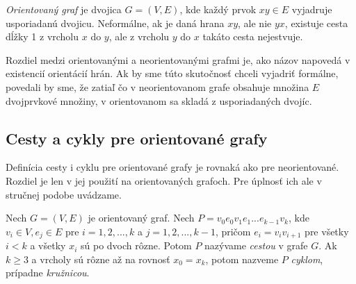 \textit{Orientovaný graf} je dvojica $G = (V, E)$, kde každý prvok $xy \in E$ vyjadruje usporiadanú dvojicu. Neformálne, ak je daná hrana $xy$, ale nie $yx$, existuje cesta dĺžky 1 z vrcholu $x$ do $y$, ale z vrcholu $y$ do $x$ takáto cesta nejestvuje.\newline

Rozdiel medzi orientovanými a neorientovanými grafmi je, ako názov napovedá v existencií orientácií hrán. Ak by sme túto skutočnosť chceli vyjadriť formálne, povedali by sme, že zatiaľ čo v neorientovanom grafe obsahuje množina $E$ dvojprvkové množiny, v orientovanom sa skladá z usporiadaných dvojíc.\newline


\subsection{Cesty a cykly pre orientované grafy}

Definícia cesty i cyklu pre orientované grafy je rovnaká ako pre neorientované. Rozdiel je len v jej použití na orientovaných grafoch. Pre úplnosť ich ale v stručnej podobe uvádzame.\newline

Nech $G = (V, E)$ je orientovaný graf. Nech $P = v_{0}e_{0}v_{1}e_{1} ... e_{k-1}v_{k}$, kde $ v_{i} \in V, e_{j} \in E$ pre $i = 1, 2, ..., k$ a $j = 1, 2, ..., k-1$, pričom $e_{i} = v_{i}v_{i+1}$ pre všetky $i < k$ a  všetky $x_{i}$ sú po dvoch rôzne. Potom $P$ nazývame \textit{cestou} v grafe $G$. Ak $k\geq 3$ a vrcholy sú rôzne až na rovnosť $x_{0} = x_{k}$, potom nazveme $P$ \textit{cyklom}, prípadne \textit{kružnicou}. \cite[kapitola 1.4]{bang2008digraphs}



